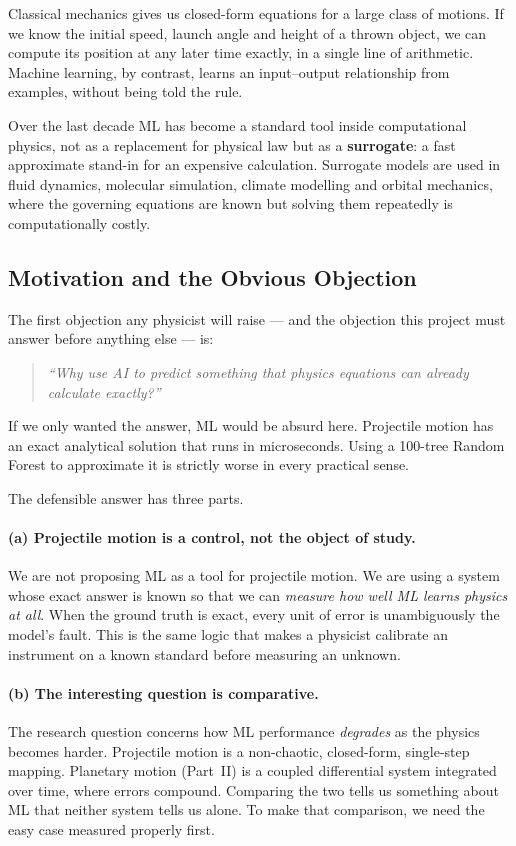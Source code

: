 \documentclass[11pt,a4paper]{article}
\begin{document}
Classical mechanics gives us closed-form equations for a large class of motions. If we know the
initial speed, launch angle and height of a thrown object, we can compute its position at any later
time exactly, in a single line of arithmetic. Machine learning, by contrast, learns an
input--output relationship from examples, without being told the rule.

Over the last decade ML has become a standard tool inside computational physics, not as a
replacement for physical law but as a \textbf{surrogate}: a fast approximate stand-in for an
expensive calculation. Surrogate models are used in fluid dynamics, molecular simulation, climate
modelling and orbital mechanics, where the governing equations are known but solving them
repeatedly is computationally costly.

\subsection{Motivation and the Obvious Objection}\label{sec:whyai}

The first objection any physicist will raise --- and the objection this project must answer before
anything else --- is:

\begin{quote}
\textit{``Why use AI to predict something that physics equations can already calculate exactly?''}
\end{quote}

If we only wanted the answer, ML would be absurd here. Projectile motion has an exact analytical
solution that runs in microseconds. Using a 100-tree Random Forest to approximate it is strictly
worse in every practical sense.

The defensible answer has three parts.

\paragraph{(a) Projectile motion is a control, not the object of study.}
We are not proposing ML as a tool for projectile motion. We are using a system whose exact answer
is known so that we can \emph{measure how well ML learns physics at all}. When the ground truth is
exact, every unit of error is unambiguously the model's fault. This is the same logic that makes a
physicist calibrate an instrument on a known standard before measuring an unknown.

\paragraph{(b) The interesting question is comparative.}
The research question concerns how ML performance \emph{degrades} as the physics becomes harder.
Projectile motion is a non-chaotic, closed-form, single-step mapping. Planetary motion (Part~II) is
a coupled differential system integrated over time, where errors compound. Comparing the two tells
us something about ML that neither system tells us alone. To make that comparison, we need the easy
case measured properly first.
\end{document}
